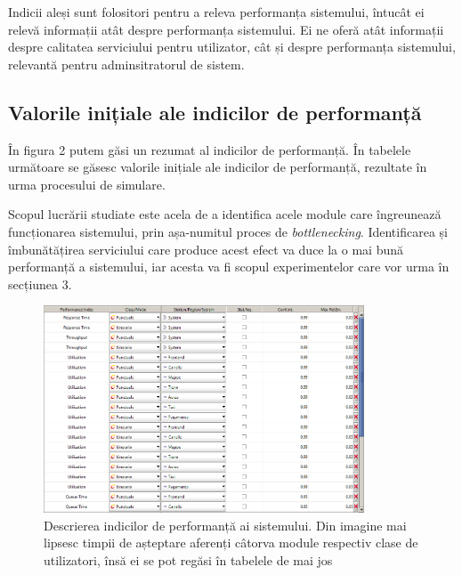 \documentclass[12pt]{article}
\begin{document}
            Indicii aleși sunt folositori pentru a releva performanța sistemului, întucât ei relevă informații atât despre performanța sistemului. Ei ne oferă atât informații despre calitatea serviciului pentru utilizator, cât și despre performanța sistemului, relevantă pentru adminsitratorul de sistem.

        \subsection{Valorile inițiale ale indicilor de performanță}
            În figura 2 putem găsi un rezumat al indicilor de performanță. În tabelele următoare se găsesc valorile inițiale ale indicilor de performanță, rezultate în urma procesului de simulare.

            Scopul lucrării studiate este acela de a identifica acele module care îngreunează funcționarea sistemului, prin așa-numitul proces de \textit{bottlenecking}. Identificarea și îmbunătățirea serviciului care produce acest efect va duce la o mai bună performanță a sistemului, iar acesta va fi scopul experimentelor care vor urma în secțiunea 3.
            \pagebreak

            \begin{figure}[!h]
                \centering
                \includegraphics[width=0.85\textwidth]{images/perf_indices.png}
                \caption{Descrierea indicilor de performanță ai sistemului. Din imagine mai lipsesc timpii de așteptare aferenți câtorva module respectiv clase de utilizatori, însă ei se pot regăsi în tabelele de mai jos}
            \end{figure}
\end{document}
